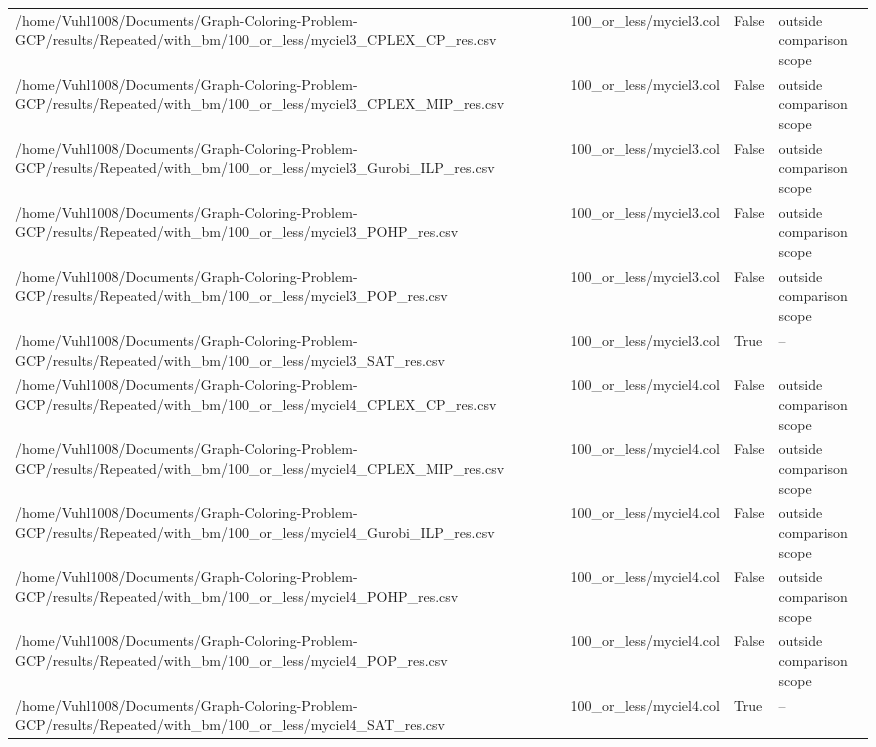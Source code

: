 \begin{table}[htbp]
\begin{tabular}{llll}
/home/Vuhl1008/Documents/Graph-Coloring-Problem-GCP/results/Repeated/with\_bm/100\_or\_less/myciel3\_CPLEX\_CP\_res.csv & 100\_or\_less/myciel3.col & False & outside comparison scope \\
/home/Vuhl1008/Documents/Graph-Coloring-Problem-GCP/results/Repeated/with\_bm/100\_or\_less/myciel3\_CPLEX\_MIP\_res.csv & 100\_or\_less/myciel3.col & False & outside comparison scope \\
/home/Vuhl1008/Documents/Graph-Coloring-Problem-GCP/results/Repeated/with\_bm/100\_or\_less/myciel3\_Gurobi\_ILP\_res.csv & 100\_or\_less/myciel3.col & False & outside comparison scope \\
/home/Vuhl1008/Documents/Graph-Coloring-Problem-GCP/results/Repeated/with\_bm/100\_or\_less/myciel3\_POHP\_res.csv & 100\_or\_less/myciel3.col & False & outside comparison scope \\
/home/Vuhl1008/Documents/Graph-Coloring-Problem-GCP/results/Repeated/with\_bm/100\_or\_less/myciel3\_POP\_res.csv & 100\_or\_less/myciel3.col & False & outside comparison scope \\
/home/Vuhl1008/Documents/Graph-Coloring-Problem-GCP/results/Repeated/with\_bm/100\_or\_less/myciel3\_SAT\_res.csv & 100\_or\_less/myciel3.col & True & -- \\
/home/Vuhl1008/Documents/Graph-Coloring-Problem-GCP/results/Repeated/with\_bm/100\_or\_less/myciel4\_CPLEX\_CP\_res.csv & 100\_or\_less/myciel4.col & False & outside comparison scope \\
/home/Vuhl1008/Documents/Graph-Coloring-Problem-GCP/results/Repeated/with\_bm/100\_or\_less/myciel4\_CPLEX\_MIP\_res.csv & 100\_or\_less/myciel4.col & False & outside comparison scope \\
/home/Vuhl1008/Documents/Graph-Coloring-Problem-GCP/results/Repeated/with\_bm/100\_or\_less/myciel4\_Gurobi\_ILP\_res.csv & 100\_or\_less/myciel4.col & False & outside comparison scope \\
/home/Vuhl1008/Documents/Graph-Coloring-Problem-GCP/results/Repeated/with\_bm/100\_or\_less/myciel4\_POHP\_res.csv & 100\_or\_less/myciel4.col & False & outside comparison scope \\
/home/Vuhl1008/Documents/Graph-Coloring-Problem-GCP/results/Repeated/with\_bm/100\_or\_less/myciel4\_POP\_res.csv & 100\_or\_less/myciel4.col & False & outside comparison scope \\
/home/Vuhl1008/Documents/Graph-Coloring-Problem-GCP/results/Repeated/with\_bm/100\_or\_less/myciel4\_SAT\_res.csv & 100\_or\_less/myciel4.col & True & -- \\

\end{tabular}
\end{table}
